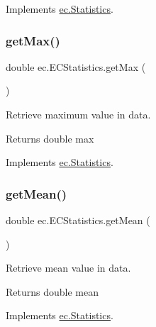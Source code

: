 Implements \hyperlink{interfaceec_1_1_statistics_aa9a82f2a37f7f6563106075872bc7af2}{ec.\+Statistics}.

\mbox{\label{classec_1_1_e_c_statistics_a5585b02f584a18bef7a792b76710c225}} 
\subsubsection{\texorpdfstring{get\+Max()}{getMax()}}
{\footnotesize\ttfamily double ec.\+E\+C\+Statistics.\+get\+Max (\begin{DoxyParamCaption}{ }\end{DoxyParamCaption})}



Retrieve maximum value in data. 

\begin{DoxyReturn}{Returns}
double max 
\end{DoxyReturn}


Implements \hyperlink{interfaceec_1_1_statistics_a1cf8e3f12f56957e4133ce4cd07277dc}{ec.\+Statistics}.

\mbox{\label{classec_1_1_e_c_statistics_a62f3366afb939bb372e1ec1fd5aec3bc}} 
\subsubsection{\texorpdfstring{get\+Mean()}{getMean()}}
{\footnotesize\ttfamily double ec.\+E\+C\+Statistics.\+get\+Mean (\begin{DoxyParamCaption}{ }\end{DoxyParamCaption})}



Retrieve mean value in data. 

\begin{DoxyReturn}{Returns}
double mean 
\end{DoxyReturn}


Implements \hyperlink{interfaceec_1_1_statistics_aa25ad8afd473f6540041526226d946bd}{ec.\+Statistics}.

\mbox{\label{classec_1_1_e_c_statistics_a2e37a5bd92ed681173461776f562375e}} 
